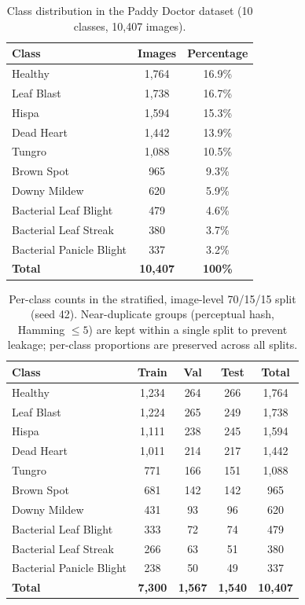 \documentclass[pdflatex,sn-mathphys-num]{sn-jnl}%
\begin{document}
\begin{table}[htbp]
\centering
\caption{Class distribution in the Paddy Doctor dataset (10 classes, 10,407 images).}
\label{tab:dataset-distribution}
\begin{tabular}{lcc}
\toprule
\textbf{Class} & \textbf{Images} & \textbf{Percentage} \\
\midrule
Healthy & 1,764 & 16.9\% \\
Leaf Blast & 1,738 & 16.7\% \\
Hispa & 1,594 & 15.3\% \\
Dead Heart & 1,442 & 13.9\% \\
Tungro & 1,088 & 10.5\% \\
Brown Spot & 965 & 9.3\% \\
Downy Mildew & 620 & 5.9\% \\
Bacterial Leaf Blight & 479 & 4.6\% \\
Bacterial Leaf Streak & 380 & 3.7\% \\
Bacterial Panicle Blight & 337 & 3.2\% \\
\midrule
\textbf{Total} & \textbf{10,407} & \textbf{100\%} \\
\bottomrule
\end{tabular}
\end{table}

\begin{table}[htbp]
\centering
\caption{Per-class counts in the stratified, image-level 70/15/15 split (seed 42). Near-duplicate groups (perceptual hash, Hamming $\leq 5$) are kept within a single split to prevent leakage; per-class proportions are preserved across all splits.}
\label{tab:split-counts}
\begin{tabular}{lcccc}
\toprule
\textbf{Class} & \textbf{Train} & \textbf{Val} & \textbf{Test} & \textbf{Total} \\
\midrule
Healthy & 1,234 & 264 & 266 & 1,764 \\
Leaf Blast & 1,224 & 265 & 249 & 1,738 \\
Hispa & 1,111 & 238 & 245 & 1,594 \\
Dead Heart & 1,011 & 214 & 217 & 1,442 \\
Tungro & 771 & 166 & 151 & 1,088 \\
Brown Spot & 681 & 142 & 142 & 965 \\
Downy Mildew & 431 & 93 & 96 & 620 \\
Bacterial Leaf Blight & 333 & 72 & 74 & 479 \\
Bacterial Leaf Streak & 266 & 63 & 51 & 380 \\
Bacterial Panicle Blight & 238 & 50 & 49 & 337 \\
\midrule
\textbf{Total} & \textbf{7,300} & \textbf{1,567} & \textbf{1,540} & \textbf{10,407} \\
\bottomrule
\end{tabular}
\end{table}
\end{document}
